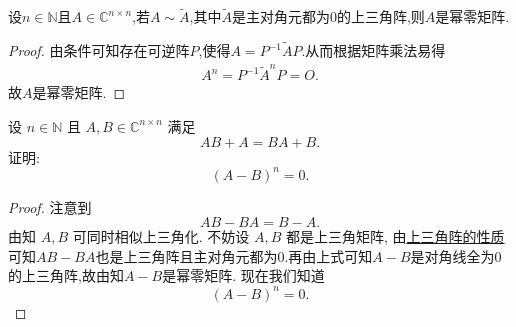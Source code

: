\documentclass[../../main.tex]{subfiles}
\begin{document}
\begin{proposition}\label{proposition:与主对角元都为0的上三角阵相似的矩阵一定是幂零阵}
设$n\in \mathbb{N}$且$A\in \mathbb{C}^{n\times n}$,若$A\sim \widetilde{A}$,其中$\widetilde{A}$是主对角元都为0的上三角阵,则$A$是幂零矩阵.
\end{proposition}
\begin{proof}
由条件可知存在可逆阵$P$,使得$A=P^{-1}\widetilde{A}P$.从而根据矩阵乘法易得
\begin{align*}
A^n=P^{-1}\widetilde{A}^nP=O.
\end{align*}
故$A$是幂零矩阵.

\end{proof}

\begin{example}
设 $n \in \mathbb{N}$ 且 $A, B \in \mathbb{C}^{n \times n}$ 满足
\[
AB + A = BA + B.
\]
证明:
\[
(A - B)^n = 0.
\]
\end{example}
\begin{proof}
注意到
\[
AB - BA = B - A.
\]
由知 $A, B$ 可同时相似上三角化. 不妨设 $A, B$ 都是上三角矩阵, 由\hyperref[proposition:上三角阵性质]{上三角阵的性质}可知$AB-BA$也是上三角阵且主对角元都为0.再由上式可知$A - B$是对角线全为0的上三角阵,故由知$A-B$是幂零矩阵. 现在我们知道
\[
(A - B)^n = 0.
\]

\end{proof}
\end{document}
